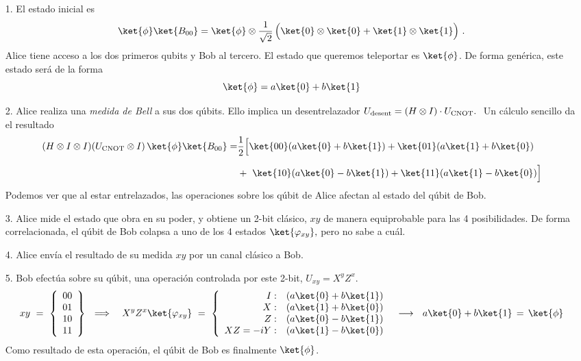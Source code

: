 \documentclass[a4paper,11pt]{book} %
\numberwithin{equation}{chapter}
\def\Lc{\Bigl[}
\def\Rc{\Bigr]}
\def\L.{\Bigl.}
\def\R.{\Bigr.}
\begin{document}
\begin{itemize}
	\item[1.] El estado inicial es
\begin{equation} 
\ket{\phi} \ket{B_{00}} =  \ket{\phi}\otimes \frac{1}{\sqrt{2}}\left(\ket{0}\otimes \ket{0} + \ket{1}\otimes\ket{1}\rule{0mm}{4mm}\right)\, .
\end{equation}
Alice tiene acceso a los dos primeros qubits y Bob al tercero. El estado que queremos teleportar es $\ket{\phi}$. De forma genérica, este estado será de la forma
\begin{equation}
\ket{\phi} = a \ket{0} + b \ket{1}
\end{equation}

	\item[2.] Alice realiza una  \textit{medida de Bell} a sus dos qúbits.
Ello  implica un desentrelazador $U_{\rm desent}= (H \otimes I)\cdot U_{\rm CNOT}.~$
Un cálculo sencillo  da el resultado
	\begin{align*} 
	(H \otimes I\otimes I)(U_{\rm CNOT}\otimes I)\, \ket{\phi}\ket{B_{00}}  = &  \frac{1}{2}
	\Lc \rule{0mm}{3mm} \ket{00}(a\ket{0} + b\ket{1}) + \ket{01}(a\ket{1}+ b\ket{0}) \R. \\
	\rule{0mm}{6mm}
	&\L.  \rule{0mm}{3mm}+ ~\ket{10}(a\ket{0}-b\ket{1}) + \ket{11}(a\ket{1}-b\ket{0}) \Rc
	\end{align*}
	Podemos ver que al estar entrelazados, las operaciones sobre los qúbit de Alice afectan al estado del qúbit de Bob. 

	\item[3.] Alice mide el estado que obra en su poder, y obtiene un 2-bit  clásico, $xy$ de manera equiprobable para las 4 posibilidades. De forma correlacionada, el qúbit de Bob colapsa a uno de los 4 estados $\ket{\varphi_{xy}},$ pero no sabe a cuál. 

	\item[4.] Alice envía el resultado de su medida $xy$ por un canal clásico a Bob.
	
	\item[5.] Bob efectúa sobre su qúbit, una operación controlada por este 2-bit, $U_{xy} =  X^y Z^x $. 
\begin{equation}
xy ~=~ \left\{ \begin{array}{c} 00 \\ 01 \\ 10 \\ 11 \end{array} \right\}~~ \Longrightarrow  
~~~ X^y Z^x \ket{\varphi_{xy}} ~=~ \left\{  \begin{array}{rl}    I :& (a\ket{0} + b\ket{1})  \\    X: & (a\ket{1} + b\ket{0})  \\  Z:& (a\ket{0} - b\ket{1})  
\\  XZ = -iY:&   (a\ket{1} - b\ket{0}) \\
       \end{array} \right. ~~ \longrightarrow  ~~ a \ket{0} + b\ket{1}\,  = \, \ket{\phi}
\end{equation}
Como resultado de esta operación, el qúbit de Bob es finalmente $\ket{\phi}$.

\end{itemize}
\end{document}

